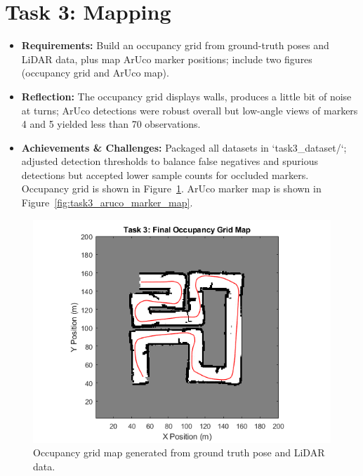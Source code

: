 \documentclass[conference]{IEEEtran}
\begin{document}
\section{Task 3: Mapping} 
\begin{itemize}
  \item \textbf{Requirements:} Build an occupancy grid from ground-truth poses and LiDAR data, plus map ArUco marker positions; include two figures (occupancy grid and ArUco map).
  \item \textbf{Reflection:} The occupancy grid displays walls, produces a little bit of noise at turns; ArUco detections were robust overall but low-angle views of markers 4 and 5 yielded less than 70 observations.
  \item \textbf{Achievements \& Challenges:} Packaged all datasets in `task3\_dataset/`; adjusted detection thresholds to balance false negatives and spurious detections but accepted lower sample counts for occluded markers. Occupancy grid is shown in Figure~\ref{fig:task3_occupancy_grid_map}. ArUco marker map is shown in Figure~\ref{fig:task3_aruco_marker_map}.
\end{itemize}
\begin{figure}[ht]
  \centering
  \includegraphics[width=\linewidth]{images/task3_occupancy_grid_map.png}
  \caption{Occupancy grid map generated from ground truth pose and LiDAR data.}
  \label{fig:task3_occupancy_grid_map}
\end{figure}
\end{document}
